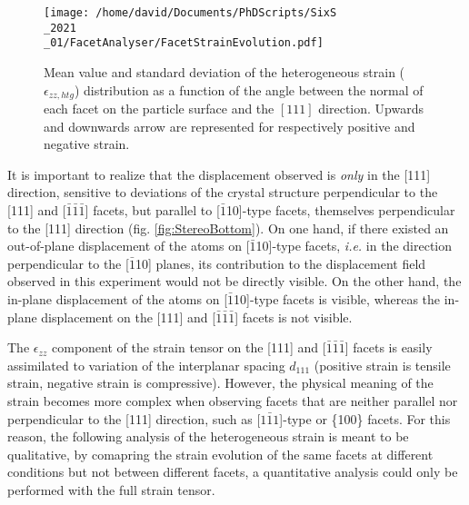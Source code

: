 \begin{figure}[!htb]
    \centering
    \texttt{[image: /home/david/Documents/PhDScripts/SixS\\\_2021\\\_01/FacetAnalyser/FacetStrainEvolution.pdf]}
    \caption{
        Mean value and standard deviation of the heterogeneous strain ($\epsilon_{zz, htg}$) distribution as a function of the angle between the normal of each facet on the particle surface and the $[111]$ direction.
        Upwards and downwards arrow are represented for respectively positive and negative strain.
    }
    \label{fig:AmaterasuStrain}
\end{figure}

It is important to realize that the displacement observed is \textit{only} in the [111] direction, sensitive to deviations of the crystal structure perpendicular to the [111] and [$\bar{1}\bar{1}\bar{1}$] facets, but parallel to [$\bar{1}$10]-type facets, themselves perpendicular to the [111] direction (fig. \ref{fig:StereoBottom}).
On one hand, if there existed an out-of-plane displacement of the atoms on [$\bar{1}$10]-type facets, \textit{i.e.} in the direction perpendicular to the [$\bar{1}$10] planes, its contribution to the displacement field observed in this experiment would not be directly visible.
On the other hand, the in-plane displacement of the atoms on [$\bar{1}$10]-type facets is visible, whereas the in-plane displacement on the [111] and [$\bar{1}\bar{1}\bar{1}$] facets is not visible.

The $\epsilon_{zz}$ component of the strain tensor on the [111] and [$\bar{1}\bar{1}\bar{1}$] facets is easily assimilated to variation of the interplanar spacing $d_{111}$ (positive strain is tensile strain, negative strain is compressive).
However, the physical meaning of the strain becomes more complex when observing facets that are neither parallel nor perpendicular to the [111] direction, such as [$1\bar{1}1$]-type or \{100\} facets.
For this reason, the following analysis of the heterogeneous strain is meant to be qualitative, by comapring the strain evolution of the same facets at different conditions but not between different facets, a quantitative analysis could only be performed with the full strain tensor.

